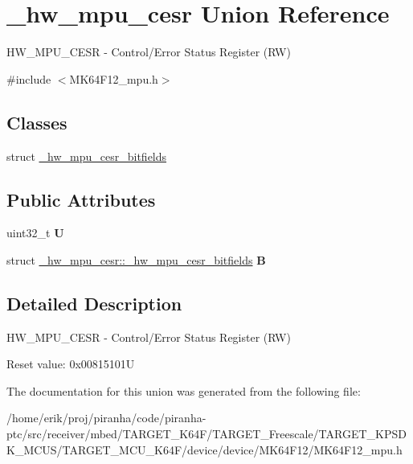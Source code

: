 \hypertarget{union__hw__mpu__cesr}{}\section{\+\_\+hw\+\_\+mpu\+\_\+cesr Union Reference}
\label{union__hw__mpu__cesr}


H\+W\+\_\+\+M\+P\+U\+\_\+\+C\+E\+SR -\/ Control/\+Error Status Register (RW)  




{\ttfamily \#include $<$M\+K64\+F12\+\_\+mpu.\+h$>$}

\subsection*{Classes}
\begin{DoxyCompactItemize}
\item 
struct \hyperlink{struct__hw__mpu__cesr_1_1__hw__mpu__cesr__bitfields}{\+\_\+hw\+\_\+mpu\+\_\+cesr\+\_\+bitfields}
\end{DoxyCompactItemize}
\subsection*{Public Attributes}
\begin{DoxyCompactItemize}
\item 
uint32\+\_\+t {\bfseries U}\hypertarget{union__hw__mpu__cesr_abe32250c9f0040c465a366944e7a53c9}{}\label{union__hw__mpu__cesr_abe32250c9f0040c465a366944e7a53c9}

\item 
struct \hyperlink{struct__hw__mpu__cesr_1_1__hw__mpu__cesr__bitfields}{\+\_\+hw\+\_\+mpu\+\_\+cesr\+::\+\_\+hw\+\_\+mpu\+\_\+cesr\+\_\+bitfields} {\bfseries B}\hypertarget{union__hw__mpu__cesr_a9449bf76c7e328cd8934a40677fdfd9e}{}\label{union__hw__mpu__cesr_a9449bf76c7e328cd8934a40677fdfd9e}

\end{DoxyCompactItemize}


\subsection{Detailed Description}
H\+W\+\_\+\+M\+P\+U\+\_\+\+C\+E\+SR -\/ Control/\+Error Status Register (RW) 

Reset value\+: 0x00815101U 

The documentation for this union was generated from the following file\+:\begin{DoxyCompactItemize}
\item 
/home/erik/proj/piranha/code/piranha-\/ptc/src/receiver/mbed/\+T\+A\+R\+G\+E\+T\+\_\+\+K64\+F/\+T\+A\+R\+G\+E\+T\+\_\+\+Freescale/\+T\+A\+R\+G\+E\+T\+\_\+\+K\+P\+S\+D\+K\+\_\+\+M\+C\+U\+S/\+T\+A\+R\+G\+E\+T\+\_\+\+M\+C\+U\+\_\+\+K64\+F/device/device/\+M\+K64\+F12/M\+K64\+F12\+\_\+mpu.\+h\end{DoxyCompactItemize}
